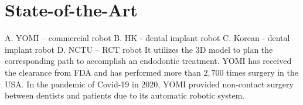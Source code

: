 \chapter{State-of-the-Art}
A.	YOMI – commercial robot
B.	HK - dental implant robot
C.	Korean - dental implant robot
D.	NCTU – RCT robot
						It utilizes the 3D model to plan the corresponding path to accomplish an endodontic treatment.
YOMI has received the clearance from FDA and has performed more than $2,700$ times surgery in the USA. In the pandemic of Covid-19 in 2020, YOMI provided non-contact surgery between dentists and patients due to its automatic robotic system. 